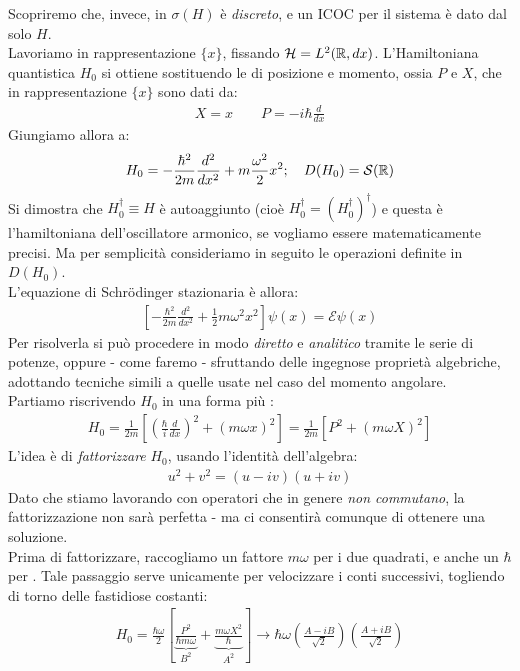 \documentclass[../../FisicaTeorica.tex]{subfiles}
\begin{document}
Scopriremo che, invece, in \MQ $\sigma(H)$ è \textit{discreto}, e un ICOC per il sistema è dato dal solo $H$.\\
Lavoriamo in rappresentazione $\{x\}$, fissando $\mathcal{H}=L^2(\mathbb{R},dx)$. L'Hamiltoniana quantistica $H_0$ si ottiene sostituendo le  di posizione e momento, ossia $P$ e $X$, che in rappresentazione $\{x\}$ sono dati da:
\begin{align*}
X = x \qquad P=-i\hbar\frac{d}{dx}
\end{align*}
Giungiamo allora a:
\[
H_0 = -\frac{\hbar^2}{2m}\frac{d^2}{dx^2}+m\frac{\omega^2}{2}x^2; \quad D(H_0)=\mathcal{S}(\mathbb{R})
\]
Si dimostra che $H_0^\dag \equiv H$ è autoaggiunto (cioè $H_0^\dag = (H_0^\dag)^\dag$) e questa è l'hamiltoniana dell'oscillatore armonico, se vogliamo essere matematicamente precisi. Ma per semplicità consideriamo in seguito le operazioni definite in $D(H_0)$.\\ 
L'equazione di Schr\"odinger stazionaria è allora:
\begin{align*}
\left[-\frac{\hbar^2}{2m} \frac{d^2}{dx^2} + \frac{1}{2}m\omega^2 x^2\right]\psi(x) = \mathcal{E}\psi(x)
\end{align*}
Per risolverla si può procedere in modo \textit{diretto} e \textit{analitico} tramite le serie di potenze, oppure - come faremo - sfruttando delle ingegnose proprietà algebriche, adottando tecniche simili a quelle usate nel caso del momento angolare.\\
Partiamo riscrivendo $H_0$ in una forma più :
\begin{align*}
H_0 = \frac{1}{2m}\left[\left(\frac{\hbar}{i}\frac{d}{dx}\right)^2 + (m\omega x)^2 \right]=\frac{1}{2m}\left[P^2+(m\omega X)^2\right]
\end{align*}
L'idea è di \textit{fattorizzare} $H_0$, usando l'identità dell'algebra:
\begin{align*}
u^2+v^2 = (u-iv)(u+iv)
\end{align*}
Dato che stiamo lavorando con operatori che in genere \textit{non commutano}, la fattorizzazione non sarà perfetta - ma ci consentirà comunque di ottenere una soluzione.\\
Prima di fattorizzare, raccogliamo un fattore $m\omega$ per  i due quadrati, e anche un $\hbar$ per . Tale passaggio serve unicamente per velocizzare i conti successivi, togliendo di torno delle fastidiose costanti:
\begin{align*}
H_0 = \frac{\hbar\omega}{2}\left[\underbrace{\frac{P^2}{\hbar m\omega}}_{B^2} + \underbrace{\frac{m\omega X^2}{\hbar}}_{A^2}\right] \to \hbar \omega \left(\frac{A-iB}{\sqrt{2}}\right)\left(\frac{A+iB}{\sqrt{2}}\right)
\end{align*}
\end{document}
